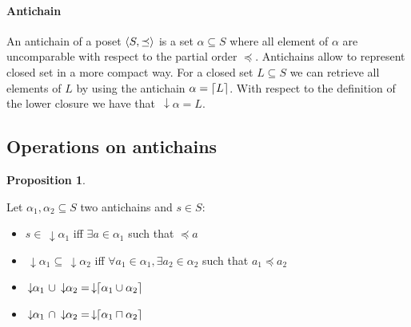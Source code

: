 \documentclass[letterpaper]{article}
\DeclarePairedDelimiter{\ceil}{\lceil}{\rceil}
\DeclarePairedDelimiter{\tuple}{\langle}{\rangle}
\newcommand{\darrow}{\, \downarrow \!\!}
\theoremstyle{definition}
\newtheorem{proposition}{Proposition}[subsection]
\begin{document}
\paragraph{Antichain}

An antichain of a poset $\tuple{S, \preceq}$
is a set $\alpha \subseteq S$ where all element of $\alpha$
are uncomparable with respect to the partial order $\preceq$.
Antichains allow to represent closed set in a more compact way.
For a closed set $L \subseteq S$ we can retrieve all elements of $L$ by using
the antichain $\alpha = \ceil{L}$. With respect
to the definition of the lower closure we have that $\darrow \alpha = L$.

\subsection{Operations on antichains}




\begin{proposition}

\label{antichains_ops}

Let $\alpha_1, \alpha_2 \subseteq S$ two antichains and $s \in S$:

\begin{itemize}
    \item $s \in \darrow \alpha_1$
    iff $\exists a \in \alpha_1$ such that $\preceq a$
    \item $\darrow \alpha_1 \subseteq \darrow \alpha_2$
    iff $\forall a_1 \in \alpha_1,
    \exists a_2 \in \alpha_2$ such that $a_1 \preceq a_2$
    \item $ \darrow \alpha_1 \ \cup \darrow \alpha_2 =
    \darrow \ceil{\alpha_1 \cup \alpha_2}$
    \item $\darrow \alpha_1 \ \cap \darrow \alpha_2 =
    \darrow \ceil{\alpha_1 \sqcap \alpha_2}$


\end{itemize}

\end{proposition}



%
%
\end{document}
